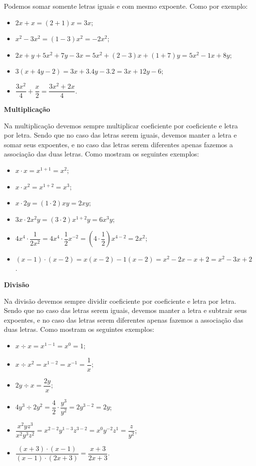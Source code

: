  Podemos somar somente letras iguais e com mesmo expoente. Como por exemplo:

 \begin{itemize}
  \item $2x + x= (2+1)x= 3x$;
  \item $x^2 - 3x^2= (1-3)x^2= -2x^2$;
  \item $2x + y + 5x^2 + 7y - 3x= 5x^2 + (2-3)x + (1+7)y= 5x^2 - 1x + 8y$;
  \item $3(x+ 4y-2)= 3x + 3.4y - 3.2= 3x + 12y - 6$;
  \item $\dfrac{3x^2}{4}+\dfrac{x}{2}= \dfrac{3x^2 + 2x}{4}$.
 \end{itemize}

  \vskip0.3cm

 \textbf{Multiplicação}

 Na multiplicação devemos sempre multiplicar coeficiente por coeficiente e letra por letra. Sendo que no caso das letras serem iguais, devemos manter a letra e somar seus expoentes, e no caso das letras serem diferentes apenas fazemos a associação das duas letras. Como mostram os seguintes exemplos:

  \begin{itemize}
   \item $x \cdot x = x^{1+1}= x^2$;
   \item $x \cdot x^2= x^{1+2}= x^3$;
   \item $x \cdot 2y= (1 \cdot 2)xy= 2xy$;
   \item $3x \cdot 2x^2y= (3 \cdot 2)x^{1+2}y= 6x^3y$;
   \item $4x^4 \cdot \dfrac{1}{2x^{2}}= 4x^4 \cdot \dfrac{1}{2}x^{-2}= (4 \cdot \dfrac{1}{2})x^{4-2}= 2x^2$;
   \item $(x - 1) \cdot (x - 2)= x(x-2) - 1(x-2)= x^2 -2x -x +2= x^2 - 3x + 2$.
  \end{itemize}

  \vskip0.3cm

   \textbf{Divisão}

   Na divisão devemos sempre dividir coeficiente por coeficiente e letra por letra. Sendo que no caso das letras serem iguais, devemos manter a letra e subtrair seus expoentes, e no caso das letras serem diferentes apenas fazemos a associação das duas letras. Como mostram os seguintes exemplos:

  \begin{itemize}
   \item $x \div x= x^{1-1}= x^0= 1$;
   \item $x \div x^2= x^{1-2}= x^{-1}= \dfrac{1}{x}$;
   \item $2y \div x= \dfrac{2y}{x}$;
   \item $4y^3 \div 2y^2= \dfrac{4}{2} \cdot \dfrac{y^3}{y^2}= 2y^{3-2}= 2y$;
   \item $\dfrac{x^2yz^3}{x^2y^3z^2}= x^{2-2}y^{1-3}z^{3-2}= x^0 y^{-2}z^{1}= \dfrac{z}{y^2}$;
   \item $\dfrac{(x+3) \cdot (x-1)}{(x-1)\cdot (2x+3)}= \dfrac{x+3}{2x+3}$.
  \end{itemize}

